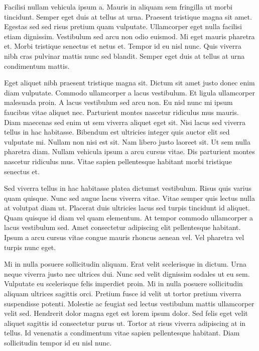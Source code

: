 \documentclass[11pt,a4paper]{article}
\begin{document}
Facilisi nullam vehicula ipsum a. Mauris in aliquam sem fringilla ut morbi tincidunt. Semper eget duis at tellus at urna. Praesent tristique magna sit amet. Egestas sed sed risus pretium quam vulputate. Ullamcorper eget nulla facilisi etiam dignissim. Vestibulum sed arcu non odio euismod. Mi eget mauris pharetra et. Morbi tristique senectus et netus et. Tempor id eu nisl nunc. Quis viverra nibh cras pulvinar mattis nunc sed blandit. Semper eget duis at tellus at urna condimentum mattis.

Eget aliquet nibh praesent tristique magna sit. Dictum sit amet justo donec enim diam vulputate. Commodo ullamcorper a lacus vestibulum. Et ligula ullamcorper malesuada proin. A lacus vestibulum sed arcu non. Eu nisl nunc mi ipsum faucibus vitae aliquet nec. Parturient montes nascetur ridiculus mus mauris. Diam maecenas sed enim ut sem viverra aliquet eget sit. Nisi lacus sed viverra tellus in hac habitasse. Bibendum est ultricies integer quis auctor elit sed vulputate mi. Nullam non nisi est sit. Nam libero justo laoreet sit. Ut sem nulla pharetra diam. Nullam vehicula ipsum a arcu cursus vitae. Dis parturient montes nascetur ridiculus mus. Vitae sapien pellentesque habitant morbi tristique senectus et.

Sed viverra tellus in hac habitasse platea dictumst vestibulum. Risus quis varius quam quisque. Nunc sed augue lacus viverra vitae. Vitae semper quis lectus nulla at volutpat diam ut. Placerat duis ultricies lacus sed turpis tincidunt id aliquet. Quam quisque id diam vel quam elementum. At tempor commodo ullamcorper a lacus vestibulum sed. Amet consectetur adipiscing elit pellentesque habitant. Ipsum a arcu cursus vitae congue mauris rhoncus aenean vel. Vel pharetra vel turpis nunc eget.

Mi in nulla posuere sollicitudin aliquam. Erat velit scelerisque in dictum. Urna neque viverra justo nec ultrices dui. Nunc sed velit dignissim sodales ut eu sem. Vulputate eu scelerisque felis imperdiet proin. Mi in nulla posuere sollicitudin aliquam ultrices sagittis orci. Pretium fusce id velit ut tortor pretium viverra suspendisse potenti. Molestie ac feugiat sed lectus vestibulum mattis ullamcorper velit sed. Hendrerit dolor magna eget est lorem ipsum dolor. Sed felis eget velit aliquet sagittis id consectetur purus ut. Tortor at risus viverra adipiscing at in tellus. Id venenatis a condimentum vitae sapien pellentesque habitant. Diam sollicitudin tempor id eu nisl nunc.
\end{document}

